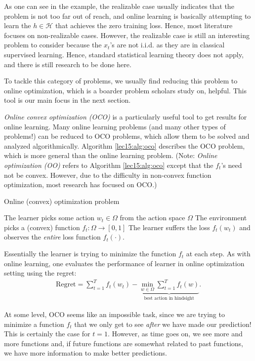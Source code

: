 As one can see in the example, the realizable case usually indicates that the problem is not too far out of reach, and online learning is basically attempting to learn the $h \in \mathcal{H}$ that achieves the zero training loss. Hence, most literature focuses on non-realizable cases. However, the realizable case is still an interesting problem to consider because the $x_t$'s are not i.i.d. as they are in classical supervised learning. Hence, standard statistical learning theory does not apply, and there is still research to be done here.
 
To tackle this category of problems, we usually find reducing this problem to online optimization, which is a boarder problem scholars study on, helpful. This tool is our main focus in the next section.
    

\textit{Online convex optimization (OCO)} is a particularly useful tool to get results for online learning. Many online learning problems (and many other types of problems!) can be reduced to OCO problems, which allow them to be solved and analyzed algorithmically. Algorithm \ref{lec15:alg:oco} describes the OCO problem, which is more general than the online learning problem. (Note: \textit{Online optimization (OO)} refers to Algorithm \ref{lec15:alg:oco} except that the $f_t$'s need not be convex. However, due to the difficulty in non-convex function optimization, most research has focused on OCO.)

    \begin{algorithm}\label{lec15:alg:oco}
    \caption{Online (convex) optimization problem}
     {
        The learner picks some action $w_t \in \Omega$ from the action space $\Omega$\;
        The environment picks a (convex) function $f_t: \Omega \to [0, 1]$\;
        The learner suffers the loss $f_t(w_t)$ and observes the \emph{entire} loss function $f_t(\cdot)$.
        }
    \end{algorithm}
    
Essentially the learner is trying to minimize the function $f_t$ at each step. As with online learning, one evaluates the performance of learner in online optimization setting using the regret:
\begin{align}
\text{Regret} = \sum_{t=1}^T f_t(w_t) - 
\underbrace{\min_{w \in \Omega} \sum_{t=1}^T f_t(w)}_\text{best action in hindsight}.
\end{align}

At some level, OCO seems like an impossible task, since we are trying to minimize a function $f_t$ that we only get to see \textit{after} we have made our prediction! This is certainly the case for $t = 1$. However, as time goes on, we see more and more functions and, if future functions are somewhat related to past functions, we have more information to make better predictions.

